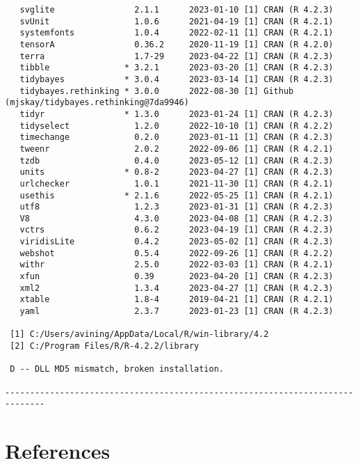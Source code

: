 \documentclass[twoside,12pt,final]{ucthesis-CA2012}
\begin{document}
\begin{ucmainmatter}
\begin{verbatim}
   svglite                2.1.1      2023-01-10 [1] CRAN (R 4.2.3)
   svUnit                 1.0.6      2021-04-19 [1] CRAN (R 4.2.1)
   systemfonts            1.0.4      2022-02-11 [1] CRAN (R 4.2.1)
   tensorA                0.36.2     2020-11-19 [1] CRAN (R 4.2.0)
   terra                  1.7-29     2023-04-22 [1] CRAN (R 4.2.3)
   tibble               * 3.2.1      2023-03-20 [1] CRAN (R 4.2.3)
   tidybayes            * 3.0.4      2023-03-14 [1] CRAN (R 4.2.3)
   tidybayes.rethinking * 3.0.0      2022-08-30 [1] Github (mjskay/tidybayes.rethinking@7da9946)
   tidyr                * 1.3.0      2023-01-24 [1] CRAN (R 4.2.3)
   tidyselect             1.2.0      2022-10-10 [1] CRAN (R 4.2.2)
   timechange             0.2.0      2023-01-11 [1] CRAN (R 4.2.3)
   tweenr                 2.0.2      2022-09-06 [1] CRAN (R 4.2.1)
   tzdb                   0.4.0      2023-05-12 [1] CRAN (R 4.2.3)
   units                * 0.8-2      2023-04-27 [1] CRAN (R 4.2.3)
   urlchecker             1.0.1      2021-11-30 [1] CRAN (R 4.2.1)
   usethis              * 2.1.6      2022-05-25 [1] CRAN (R 4.2.1)
   utf8                   1.2.3      2023-01-31 [1] CRAN (R 4.2.3)
   V8                     4.3.0      2023-04-08 [1] CRAN (R 4.2.3)
   vctrs                  0.6.2      2023-04-19 [1] CRAN (R 4.2.3)
   viridisLite            0.4.2      2023-05-02 [1] CRAN (R 4.2.3)
   webshot                0.5.4      2022-09-26 [1] CRAN (R 4.2.2)
   withr                  2.5.0      2022-03-03 [1] CRAN (R 4.2.1)
   xfun                   0.39       2023-04-20 [1] CRAN (R 4.2.3)
   xml2                   1.3.4      2023-04-27 [1] CRAN (R 4.2.3)
   xtable                 1.8-4      2019-04-21 [1] CRAN (R 4.2.1)
   yaml                   2.3.7      2023-01-23 [1] CRAN (R 4.2.3)

 [1] C:/Users/avining/AppData/Local/R/win-library/4.2
 [2] C:/Program Files/R/R-4.2.2/library

 D -- DLL MD5 mismatch, broken installation.

------------------------------------------------------------------------------
\end{verbatim}
\backmatter

\hypertarget{references}{%
\chapter*{References}\label{references}}



\end{ucmainmatter}
\end{document}
